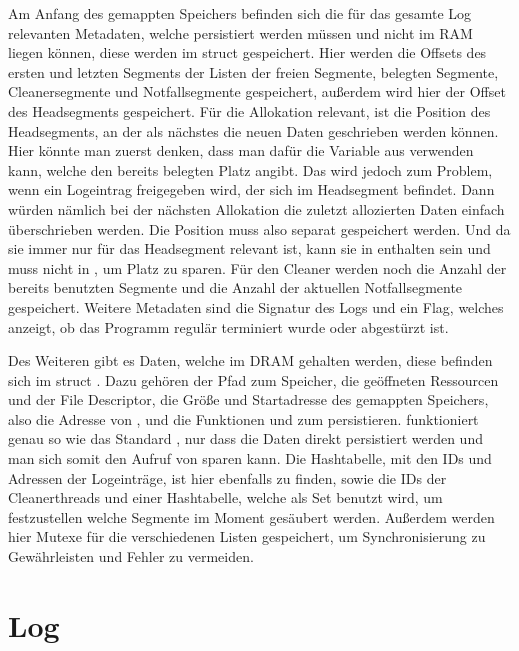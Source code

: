 \documentclass{class/thesis}
\begin{document}
\begin{thesis}
	Am Anfang des gemappten Speichers befinden sich die für das gesamte Log relevanten Metadaten, welche persistiert werden müssen und nicht im RAM liegen können, diese werden im struct  gespeichert. Hier werden die Offsets des ersten und letzten Segments der Listen der freien Segmente, belegten Segmente, Cleanersegmente und Notfallsegmente gespeichert, außerdem wird hier der Offset des Headsegments gespeichert. 
	Für die Allokation relevant, ist die Position des Headsegments, an der als nächstes die neuen Daten geschrieben werden können. Hier könnte man zuerst denken, dass man dafür die Variable  aus  verwenden kann, welche den bereits belegten Platz angibt.
	Das wird jedoch zum Problem, wenn ein Logeintrag freigegeben wird, der sich im Headsegment befindet. Dann würden nämlich bei der nächsten Allokation die zuletzt allozierten Daten einfach überschrieben werden. Die Position muss also separat gespeichert werden. Und da sie immer nur für das Headsegment relevant ist, kann sie in  enthalten sein und muss nicht in , um Platz zu sparen.
	Für den Cleaner werden noch die Anzahl der bereits benutzten Segmente und die Anzahl der aktuellen Notfallsegmente gespeichert.
	Weitere Metadaten sind die Signatur des Logs und ein Flag, welches anzeigt, ob das Programm regulär terminiert wurde oder abgestürzt ist.
	
	Des Weiteren gibt es Daten, welche im DRAM gehalten werden, diese befinden sich im struct . Dazu gehören der Pfad zum Speicher, die geöffneten Ressourcen  und der File Descriptor, die Größe und Startadresse des gemappten Speichers, also die Adresse von , und die Funktionen  und  zum persistieren. 
	 funktioniert genau so wie das Standard , nur dass die Daten direkt persistiert werden und man sich somit den Aufruf von  sparen kann.
	Die Hashtabelle, mit den IDs und Adressen der Logeinträge, ist hier ebenfalls zu finden, sowie die IDs der Cleanerthreads und einer Hashtabelle, welche als Set benutzt wird, um festzustellen welche Segmente im Moment gesäubert werden.
	Außerdem werden hier Mutexe für die verschiedenen Listen gespeichert, um Synchronisierung zu Gewährleisten und Fehler zu vermeiden.
	
	
	
	\section{Log}
	

\end{thesis}
\end{document}
